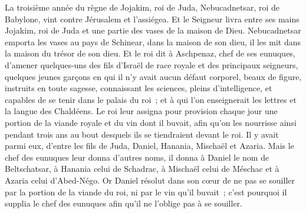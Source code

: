 \begin{multicols}{2}
\VerseOne{}La troisième année du règne de Jojakim, roi de Juda, Nebucadnetsar, roi de Babylone, vint contre Jérusalem et l'assiégea.
Et le Seigneur livra entre ses mains Jojakim, roi de Juda et une partie des vases de la maison de Dieu. Nebucadnetsar emporta les vases au pays de Schinear, dans la maison de son dieu, il les mit dans la maison du trésor de son dieu.
Et le roi dit à Aschpenaz, chef de ses eunuques, d'amener quelques-uns des fils d'Israël de race royale et des principaux seigneurs,
quelques jeunes garçons en qui il n'y avait aucun défaut corporel, beaux de figure, instruits en toute sagesse, connaissant les sciences, pleins d'intelligence, et capables de se tenir dans le palais du roi~; et à qui l'on enseignerait les lettres et la langue des Chaldéens.
Le roi leur assigna pour provision chaque jour une portion de la viande royale et du vin dont il buvait, afin qu'on les nourrisse ainsi pendant trois ans au bout desquels ils se tiendraient devant le roi.
Il y avait parmi eux, d'entre les fils de Juda, Daniel, Hanania, Mischaël et Azaria.
Mais le chef des eunuques leur donna d'autres noms, il donna à Daniel le nom de Beltschatsar, à Hanania celui de Schadrac, à Mischaël celui de Méschac et à Azaria celui d'Abed-Négo.
Or Daniel résolut dans son cœur de ne pas se souiller par la portion de la viande du roi, ni par le vin qu'il buvait~; c'est pourquoi il supplia le chef des eunuques afin qu'il ne l'oblige pas à se souiller.

\end{multicols}
